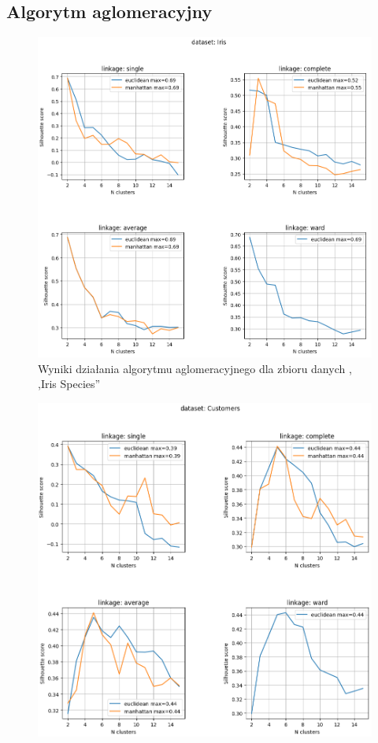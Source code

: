 \documentclass{classrep}
\begin{document}
{        \subsection{Algorytm aglomeracyjny}
        \label{result_2} {
            \begin{figure}[h]
                \centering
                \includegraphics[width=1\textwidth]{img/mum_agglomerative_iris.png}
                \caption{Wyniki działania algorytmu aglomeracyjnego dla zbioru danych ,
                ,Iris Species''}
                \label{fig:agglomerative_iris}
            \end{figure}
            \begin{figure}[h]
                \centering
                \includegraphics[width=1\textwidth]{img/mum_agglomerative_customers.png}

\end{figure}}}
\end{document}
